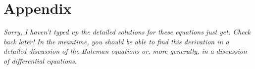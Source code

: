 \documentclass{report}
\begin{document}
\newpage
\section*{Appendix}

\textit{Sorry, I haven't typed up the detailed solutions for these equations just yet. Check back later! In the meantime, you should be able to find this derivation in a detailed discussion of the Bateman equations or, more generally, in a discussion of differential equations.}
\end{document}
